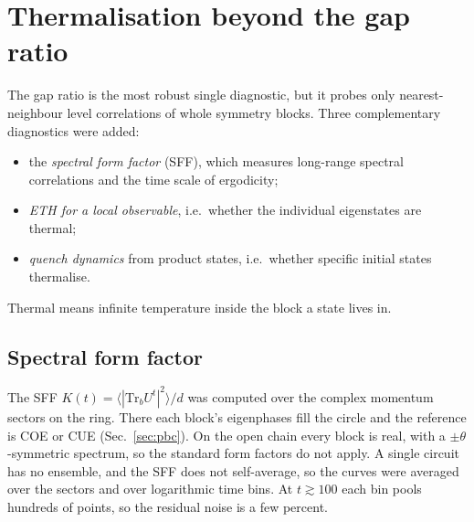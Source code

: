 \section{Thermalisation beyond the gap ratio}
\label{sec:thermal}
The gap ratio is the most robust single diagnostic, but it probes only nearest-neighbour level correlations of whole
symmetry blocks. Three complementary diagnostics were added:
\begin{itemize}
\item the \emph{spectral form factor} (SFF), which measures long-range spectral correlations and the time scale of
  ergodicity;
\item \emph{ETH for a local observable}, i.e.\ whether the individual eigenstates are thermal;
\item \emph{quench dynamics} from product states, i.e.\ whether specific initial states thermalise.
\end{itemize}
Thermal means infinite temperature inside the block a state lives in.

\begin{table}[h]
\centering\small

\caption[Thermalisation summary.]{Thermalisation summary. Ring $\langle r\rangle$: complex momentum sectors at the
largest $N$ (in brackets). ETH exponent: slope of $\log\sigma$ against $\log d$ for the eigenstate-to-eigenstate
fluctuation $\sigma$ of the magnetisation density $m=\sum_iZ_i/N$ in the complex ring sectors ($N=8\ldots14$); ETH
predicts $-1/2$. It is shown only for rules whose momentum sectors are single Krylov sectors. $t_2$: time after which
the log-binned SFF stays within a factor 2 of the RMT ramp, at $N=16$. Last four columns: $S_\mathrm{half}/S_\mathrm{Page}$
averaged over $t=200\ldots300$ after a quench at $N=14$, from random computational product states (average of 8) and
from $|h_+\rangle^{\otimes N}$ with one $|h_-\rangle$ in the middle.}
\label{tab:thermal}
\end{table}

\subsection{Spectral form factor}
The SFF $K(t)=\langle|\mathrm{Tr}_bU^t|^2\rangle/d$ was computed over the complex momentum sectors on the ring. There each
block's eigenphases fill the circle and the reference is COE or CUE (Sec.~\ref{sec:pbc}). On the open chain every block is
real, with a $\pm\theta$-symmetric spectrum, so the standard form factors do not apply. A single circuit has no ensemble,
and the SFF does not self-average, so the curves were averaged over the sectors and over logarithmic time bins. At
$t\gtrsim100$ each bin pools hundreds of points, so the residual noise is a few percent.

